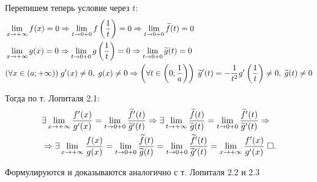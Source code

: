 \documentclass{article}
\begin{document}
Перепишем теперь условие через $t$:
\begin{align*}
	 & \lim\limits_{x\to +\infty}f(x)=0\Rightarrow\lim\limits_{t\to 0+0}f\left(\frac{1}{t}\right)=0\Rightarrow\lim\limits_{t\to 0+0}\widetilde{f}(t)=0 \\
	 & \lim\limits_{x\to +\infty}g(x)=0\Rightarrow\lim\limits_{t\to 0+0}g\left(\frac{1}{t}\right)=0\Rightarrow\lim\limits_{t\to 0+0}\widetilde{g}(t)=0 \\
	 & (\forall x\in(a;+\infty))\;g'(x)\neq 0,\;g(x)\neq 0\Rightarrow
	\left(\forall t\in\left(0;\frac{1}{a}\right)\right)\;\widetilde{g}'(t)=-\frac{1}{t^{2}}g'\left(\frac{1}{t}\right)\neq 0,\;\widetilde{g}(t)\neq 0
\end{align*}

Тогда по т. Лопиталя 2.1:
\begin{align*}
	 & \exists\lim\limits_{x\to +\infty}\frac{f'(x)}{g'(x)}=\lim\limits_{t\to 0+0}\frac{\widetilde{f}'(t)}{\widetilde{g}'(t)}\Rightarrow
	\exists\lim\limits_{t\to +\infty}\frac{\widetilde{f}(t)}{\widetilde{g}(t)}=\lim\limits_{t\to 0+0}\frac{\widetilde{f}'(t)}{\widetilde{g}'(t)}\Rightarrow  \\
	 & \Rightarrow\exists\lim\limits_{x\to +\infty}\frac{f(x)}{g(x)}=\lim\limits_{t\to 0+0}\frac{\widetilde{f}(t)}{\widetilde{g}(t)}
	=\lim\limits_{t\to 0+0}\frac{\widetilde{f}'(t)}{\widetilde{g}'(t)}=\lim\limits_{x\to+\infty}\frac{f'(x)}{g'(x)}\;\square.
\end{align*}

\theorem[Лопиталя 3.2 и 3.3]

Формулируются и доказываются аналогично с т. Лопиталя 2.2 и 2.3
\end{document}
